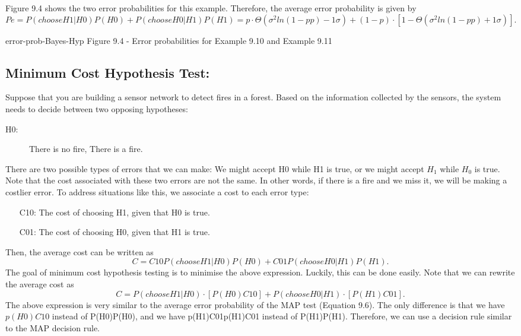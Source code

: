 \documentclass[]{report}
\begin{document}
Figure 9.4 shows the two error probabilities for this example. Therefore, the average error probability is given by
\[Pe=P(choose H1|H0)P(H0)+P(choose H0|H1)P(H1)=p⋅\Theta(\sigma^2ln(1−pp)−1σ)+(1−p)⋅[1−\Theta(\sigma^2ln(1−pp)+1σ)].\]


error-prob-Bayes-Hyp
Figure 9.4 - Error probabilities for Example 9.10 and Example 9.11

\subsection{Minimum Cost Hypothesis Test:}

Suppose that you are building a sensor network to detect fires in a forest. Based on the information collected by the sensors, the system needs to decide between two opposing hypotheses: 

\begin{description}
\item[H0:] There is no fire,
\itme[H1:] There is a fire.

\end{description}

There are two possible types of errors that we can make: We might accept H0 while H1 is true, or we might accept $H_1$ while $H_0$ is true. Note that the cost associated with these two errors are not the same. In other words, if there is a fire and we miss it, we will be making a costlier error. To address situations like this, we associate a cost to each error type: 

\begin{itemize}
\item[C10:] The cost of choosing H1, given that H0 is true.

\item[C01:] The cost of choosing H0, given that H1 is true.
\end{itemize}
Then, the average cost can be written as
\[C=C10P(choose H1|H0)P(H0)+C01P(choose H0|H1)P(H1).\]
The goal of minimum cost hypothesis testing is to minimise the above expression. Luckily, this can be done easily. Note that we can rewrite the average cost as
\[C=P(choose H1|H0)⋅[P(H0)C10]+P(choose H0|H1)⋅[P(H1)C01].\]
The above expression is very similar to the average error probability of the MAP test (Equation 9.6). The only difference is that we have $p(H0)C10$ instead of P(H0)P(H0), and we have p(H1)C01p(H1)C01 instead of P(H1)P(H1). Therefore, we can use a decision rule similar to the MAP decision rule. 
\end{document}
